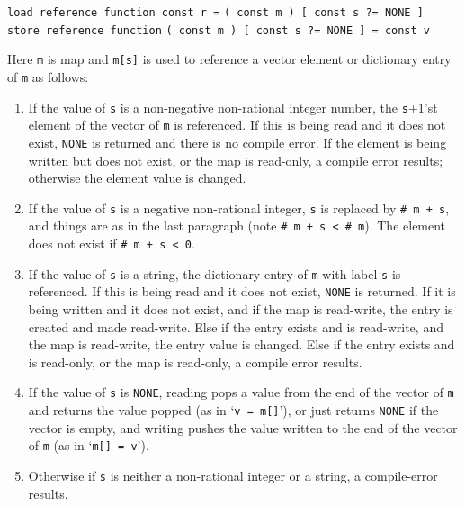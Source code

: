 \documentclass[12pt]{article}
\newenvironment{indpar}[1][0.3in]%
	{\begin{list}{}%
		     {\setlength{\itemsep}{0in}%
		      \setlength{\topsep}{0in}%
		      \setlength{\parsep}{1ex}%
		      \setlength{\labelwidth}{#1}%
		      \setlength{\leftmargin}{#1}%
		      \addtolength{\leftmargin}{\labelsep}}%
	 \item}%
	{\end{list}}
\begin{document}
{\tt load reference function const r =}
    {\tt ( const m ) [ const s ?=~NONE ]} \\
{\tt store reference function}
    {\tt ( const m ) [ const s ?=~NONE ] = const v}
\begin{indpar}
Here {\tt m} is map and {\tt m[s]} is used to reference a
vector element or dictionary entry of {\tt m} as follows:
\begin{enumerate}
\item If the value of {\tt s} is a non-negative non-rational integer number,
the {\tt s}+1'st element
of the vector of {\tt m} is referenced.  If this is being read and
it does not exist, {\tt NONE} is returned and there is no compile
error.
If the element is being written but does not exist, or the map
is read-only, a compile error results; otherwise the element
value is changed.
\item If the value of {\tt s} is a negative non-rational integer,
{\tt s} is replaced by {\tt \# m + s}, and things
are as in the last paragraph (note {\tt \# m + s < \# m}).  The element
does not exist if {\tt \# m + s < 0}.
\item If the value of {\tt s} is a string, the dictionary entry
of {\tt m} with label {\tt s} is referenced.  If this is being read and
it does not exist, {\tt NONE} is returned.  If it is being written and
it does not exist, and if the map is read-write,
the entry is created and made read-write.
Else if the entry exists and is read-write, and the map is read-write,
the entry value is changed.
Else if the entry exists and is read-only, or the map is read-only,
a compile error results.
\item If the value of {\tt s} is {\tt NONE}, reading pops a value from the
end of the vector
of {\tt m} and returns the value popped (as in `{\tt v = m[]}'),
or just returns {\tt NONE} if the vector is empty,
and writing pushes the value written to the end of the vector of {\tt m}
(as in `{\tt m[] = v}').
\item Otherwise if {\tt s} is neither a non-rational integer or a string,
a compile-error results.
\end{enumerate}
\end{indpar}
\end{document}
